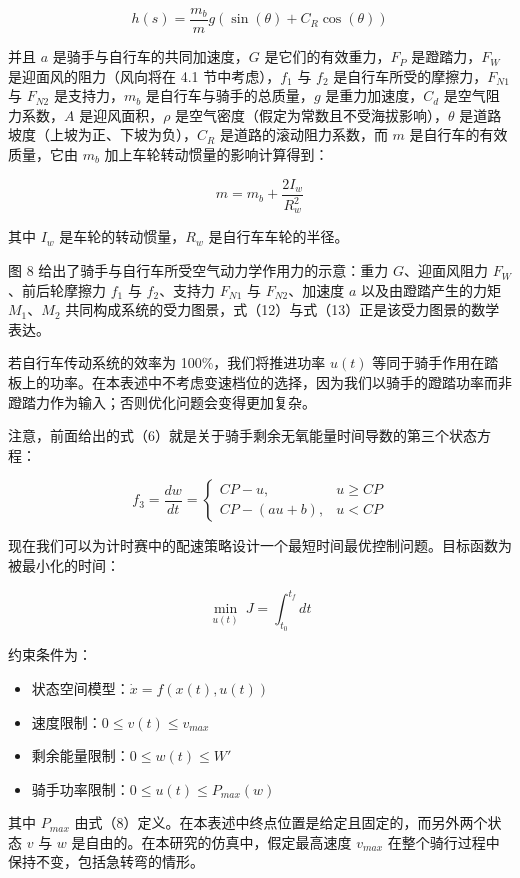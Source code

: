 \documentclass[11pt,a4paper]{ctexart}
\begin{document}
\[
h(s)=\frac{m_b}{m}g\left(\sin(\theta)+C_R\cos(\theta)\right)
\]

并且 $a$ 是骑手与自行车的共同加速度，$G$ 是它们的有效重力，$F_P$ 是蹬踏力，$F_W$ 是迎面风的阻力（风向将在 4.1 节中考虑），$f_1$ 与 $f_2$ 是自行车所受的摩擦力，$F_{N1}$ 与 $F_{N2}$ 是支持力，$m_b$ 是自行车与骑手的总质量，$g$ 是重力加速度，$C_d$ 是空气阻力系数，$A$ 是迎风面积，$\rho$ 是空气密度（假定为常数且不受海拔影响），$\theta$ 是道路坡度（上坡为正、下坡为负），$C_R$ 是道路的滚动阻力系数，而 $m$ 是自行车的有效质量，它由 $m_b$ 加上车轮转动惯量的影响计算得到：

\[
m=m_b+\frac{2I_w}{R_w^{2}}
\]

其中 $I_w$ 是车轮的转动惯量，$R_w$ 是自行车车轮的半径。

图 8 给出了骑手与自行车所受空气动力学作用力的示意：重力 $G$、迎面风阻力 $F_W$、前后轮摩擦力 $f_1$ 与 $f_2$、支持力 $F_{N1}$ 与 $F_{N2}$、加速度 $a$ 以及由蹬踏产生的力矩 $M_1$、$M_2$ 共同构成系统的受力图景，式（12）与式（13）正是该受力图景的数学表达。

若自行车传动系统的效率为 100\%，我们将推进功率 $u(t)$ 等同于骑手作用在踏板上的功率。在本表述中不考虑变速档位的选择，因为我们以骑手的蹬踏功率而非蹬踏力作为输入；否则优化问题会变得更加复杂。

注意，前面给出的式（6）就是关于骑手剩余无氧能量时间导数的第三个状态方程：

\[
f_3=\frac{dw}{dt}=\left\{\begin{array}{ll}CP-u, & u\geq CP\\[0.3em] CP-(au+b), & u<CP\end{array}\right.
\]

现在我们可以为计时赛中的配速策略设计一个最短时间最优控制问题。目标函数为被最小化的时间：

\[
\min_{u(t)}\ J=\int_{t_0}^{t_f} dt
\]

约束条件为：

\begin{itemize}
\item 状态空间模型：$\dot{x}=f(x(t),u(t))$
\item 速度限制：$0\leq v(t)\leq v_{max}$
\item 剩余能量限制：$0\leq w(t)\leq W'$
\item 骑手功率限制：$0\leq u(t)\leq P_{max}(w)$
\end{itemize}

其中 $P_{max}$ 由式（8）定义。在本表述中终点位置是给定且固定的，而另外两个状态 $v$ 与 $w$ 是自由的。在本研究的仿真中，假定最高速度 $v_{max}$ 在整个骑行过程中保持不变，包括急转弯的情形。
\end{document}
